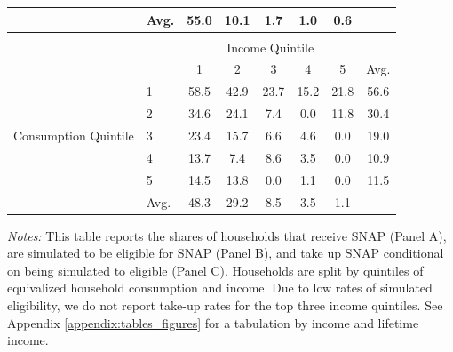 \begin{table}[t]
\begin{tabular*}{\textwidth}{@{\extracolsep{\fill}}llcccccc@{}}
                                      & Avg. & 55.0 & 10.1 & 1.7 & 1.0 & 0.6 \\ \midrule \addlinespace
\multicolumn{5}{@{}l}{\emph{Panel C: Take-Up Rate Among Simulated Eligibles}}   \\
                                      &   & \multicolumn{5}{c}{Income Quintile}                                                                    \\ \cmidrule{3-8}
                                      &   & 1                  & 2                  & 3                  & 4                  & 5       & Avg.           \\ \cmidrule{3-8}
\multirow{5}{*}{Consumption Quintile} & 1 & 58.5 & 42.9 & 23.7 & 15.2 & 21.8 & 56.6 \\
                                      & 2 & 34.6 & 24.1 & 7.4 & 0.0 & 11.8 & 30.4 \\
                                      & 3 & 23.4 & 15.7 & 6.6 & 4.6 & 0.0 & 19.0 \\
                                      & 4 & 13.7 & 7.4 & 8.6 & 3.5 & 0.0 & 10.9 \\
                                      & 5 & 14.5 & 13.8 & 0.0 & 1.1 & 0.0 & 11.5 \\ 
                                      & Avg. & 48.3 & 29.2 & 8.5 & 3.5 & 1.1 \\                                       \bottomrule
\end{tabular*}
            \begin{spacing}{1}
\begin{tablenotes}
       \item \footnotesize \textit{Notes:} This table reports the shares of households that receive SNAP (Panel A), are simulated to be eligible for SNAP (Panel B), and take up SNAP conditional on being simulated to eligible (Panel C). Households are split by quintiles of equivalized household consumption and income.  Due to low rates of simulated eligibility, we do not report take-up rates for the top three income quintiles. See Appendix \ref{appendix:tables_figures} for a tabulation by income and lifetime income.
      \end{tablenotes}
       \end{spacing}
\end{table}
    

